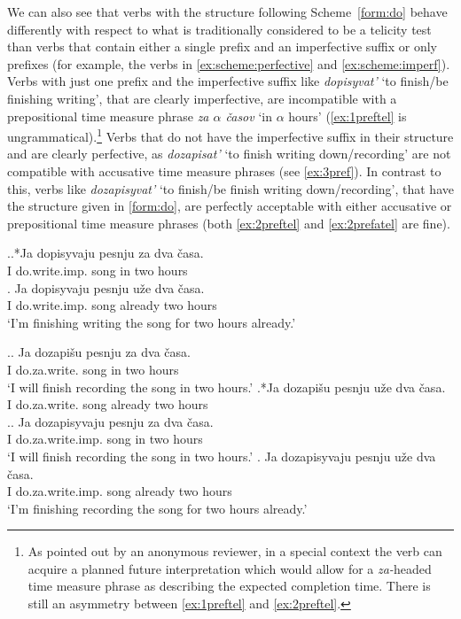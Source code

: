 We can also see that verbs with the structure following Scheme~\ref{form:do} behave differently with respect to what is traditionally considered to be a telicity test than verbs that contain either a single prefix and an imperfective suffix or only prefixes (for example, the verbs in \ref{ex:scheme:perfective} and \ref{ex:scheme:imperf}). Verbs with just one prefix and the imperfective suffix like \textit{dopisyvat'} `to finish/be finishing writing', that are clearly imperfective, are incompatible with a prepositional time measure phrase \textit{za $\alpha$ \v{c}asov} `in $\alpha$ hours' (\ref{ex:1preftel} is ungrammatical).\footnote{As pointed out by an anonymous reviewer, in a special context the verb can acquire a planned future interpretation which would allow for a \textit{za-}headed time measure phrase as describing the expected completion time. There is still an asymmetry between \ref{ex:1preftel} and \ref{ex:2preftel}.} Verbs that do not have the imperfective suffix in their structure and are clearly perfective, as \textit{dozapisat'} `to finish writing down/recording' are not compatible with accusative time measure phrases (see \ref{ex:3pref}). In contrast to this, verbs like \textit{dozapisyvat'} `to finish/be finish writing down/recording', that have the structure given in \ref{form:do}, are perfectly acceptable with either accusative or prepositional time measure phrases (both \ref{ex:2preftel} and \ref{ex:2prefatel} are fine).

\ex.\label{ex:1pref}\ag.*Ja dopisyvaju pesnju za dva \v{c}asa.\label{ex:1preftel}\\
I do.write.imp. song in two hours\\
\bg. \label{ex:1prefatel}Ja dopisyvaju pesnju u\v{z}e dva \v{c}asa.\\
I do.write.imp. song already two hours\\
\trans `I'm finishing writing the song for two hours already.'

\ex.\label{ex:3pref}\ag. \label{ex:3preftel}Ja dozapi\v{s}u pesnju za dva \v{c}asa.\\
I do.za.write. song in two hours\\
\trans `I will finish recording the song in two hours.'
\bg.*Ja dozapi\v{s}u pesnju u\v{z}e dva \v{c}asa.\label{ex:3prefatel}\\
I do.za.write. song already two hours\\

\ex.\label{ex:2pref}\ag. \label{ex:2preftel}Ja dozapisyvaju pesnju za dva \v{c}asa.\\
I do.za.write.imp. song in two hours\\
\trans `I will finish recording the song in two hours.'
\bg. \label{ex:2prefatel}Ja dozapisyvaju pesnju u\v{z}e dva \v{c}asa.\\
I do.za.write.imp. song already two hours\\
\trans `I'm finishing recording the song for two hours already.'

